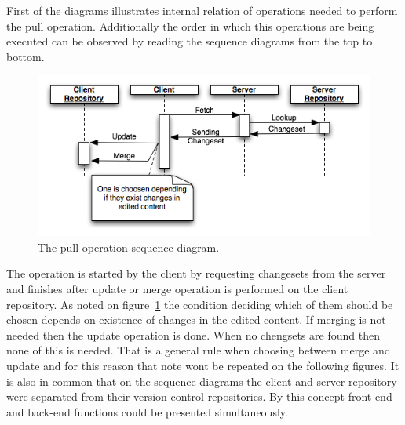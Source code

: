 First of the diagrams illustrates internal relation of operations needed to perform the pull operation. Additionally the order in which this operations are being executed can be observed by reading the sequence diagrams from the top to bottom.
\begin{figure}[ht]
\begin{center}
\includegraphics[scale=0.6]{charts/seq_update.png}
\caption{The pull operation sequence diagram.}
\label{fig:seq_update}
\end{center}
\end{figure}
The operation is started by the client by requesting changesets from the server and finishes after update or merge operation is performed on the client repository. As noted on figure~\ref{fig:seq_update} the condition deciding which of them should be chosen depends on existence of changes in the edited content. If merging is not needed then the update operation is done. When no chengsets are found then none of this is needed. That is a general rule when choosing between merge and update and for this reason that note wont be repeated on the following figures. It is also in common that on the sequence diagrams the client and server repository were separated from their version control repositories. By this concept front-end and back-end functions could be presented simultaneously. 


